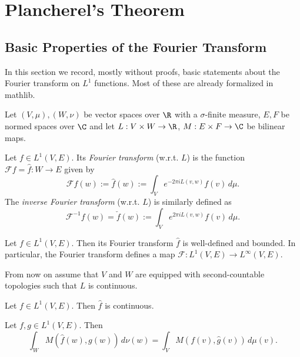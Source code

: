 \chapter{Plancherel's Theorem}
\label{chap:plancherel}
\section{Basic Properties of the Fourier Transform}
In this section we record, mostly without proofs, basic statements about the Fourier transform on
$L^1$ functions. Most of these are already formalized in mathlib.

Let $(V,\mu),(W,\nu)$ be vector spaces over $\R$ with a $\sigma$-finite measure,
$E,F$ be normed spaces over $\C$ and let $L:V\times W\to \R$, $M:E\times F\to\C$
be bilinear maps.
\begin{definition}
  \label{def:fourier-transform}
  \leanok
  Let $f\in L^1(V,E)$. Its \emph{Fourier transform} (w.r.t. $L$) is the function
  $\mathcal Ff=\widehat f:W\to E$ given by
  $$\mathcal Ff(w):=\widehat f(w):=\int_V e^{-2\pi i L(v,w)}f(v)\,d\mu.$$
  The \emph{inverse Fourier transform} (w.r.t. $L$) is similarly defined as
  $$\mathcal F^{-1}f(w)=\check f(w):=\int_Ve^{2\pi iL(v,w)}f(v)\,d\mu.$$
\end{definition}

\begin{lemma}
  \label{lem:fourier-bounded}
  \leanok
  Let $f\in L^1(V,E)$. Then its Fourier transform $\widehat f$ is well-defined and bounded.
  In particular, the Fourier transform defines a map $\mathcal F:L^1(V,E)\to L^\infty(V,E)$.
\end{lemma}

From now on assume that $V$ and $W$ are equipped with second-countable topologies such that
$L$ is continuous.
\begin{lemma}
  \label{lem:fourier-cont}
  \leanok
  Let $f\in L^1(V,E)$. Then $\widehat f$ is continuous.
\end{lemma}

\begin{lemma}
\label{lem:fourier-multiplication}
\leanok
Let $f,g\in L^1(V,E)$. Then
$$\int_WM(\widehat f(w),g(w))\,d\nu(w)=\int_VM(f(v),\widehat g(v))\,d\mu(v).$$
\end{lemma}

